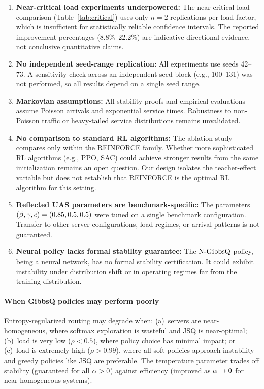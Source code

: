 \begin{enumerate}[label=\textbf{L\arabic*.}, leftmargin=2.2em]
\item \textbf{Near-critical load experiments underpowered:}
The near-critical load comparison (Table~\ref{tab:critical}) uses only $n{=}2$ replications per load factor, which is insufficient for statistically reliable confidence intervals.
The reported improvement percentages (8.8\%--22.2\%) are indicative directional evidence, not conclusive quantitative claims.

\item \textbf{No independent seed-range replication:}
All experiments use seeds 42--73. A sensitivity check across an independent seed block (e.g., 100--131) was not performed, so all results depend on a single seed range.

\item \textbf{Markovian assumptions:}
All stability proofs and empirical evaluations assume Poisson arrivals and exponential service times. Robustness to non-Poisson traffic or heavy-tailed service distributions remains unvalidated.

\item \textbf{No comparison to standard RL algorithms:}
The ablation study compares only within the REINFORCE family. Whether more sophisticated RL algorithms (e.g., PPO, SAC) could achieve stronger results from the same initialization remains an open question. Our design isolates the teacher-effect variable but does not establish that REINFORCE is the optimal RL algorithm for this setting.

\item \textbf{Reflected UAS parameters are benchmark-specific:}
The parameters $(\beta, \gamma, c) = (0.85, 0.5, 0.5)$ were tuned on a single benchmark configuration. Transfer to other server configurations, load regimes, or arrival patterns is not guaranteed.

\item \textbf{Neural policy lacks formal stability guarantee:}
The $\text{N-GibbsQ}$ policy, being a neural network, has no formal stability certification. It could exhibit instability under distribution shift or in operating regimes far from the training distribution.
\end{enumerate}

\paragraph{When GibbsQ policies may perform poorly}
Entropy-regularized routing may degrade when: (a)~servers are near-homogeneous, where softmax exploration is wasteful and JSQ is near-optimal; (b)~load is very low ($\rho < 0.5$), where policy choice has minimal impact; or (c)~load is extremely high ($\rho > 0.99$), where all soft policies approach instability and greedy policies like JSQ are preferable. The temperature parameter trades off stability (guaranteed for all $\alpha > 0$) against efficiency (improved as $\alpha \to 0$ for near-homogeneous systems).

